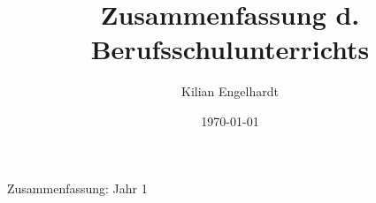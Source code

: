\documentclass[11pt,a4paper,oneside,ngerman]{article}
\author{Kilian Engelhardt}
\title{Zusammenfassung d. Berufsschulunterrichts}
\date{\today}
\begin{document}
	\begin{center}
		\Huge{Zusammenfassung: Jahr 1}
	\end{center}

%
\tableofcontents
\newpage
\pagestyle{fancy}
\setcounter{page}{1}

%
%
%
%
%

%
%
%
%
%
%
%
\end{document}
